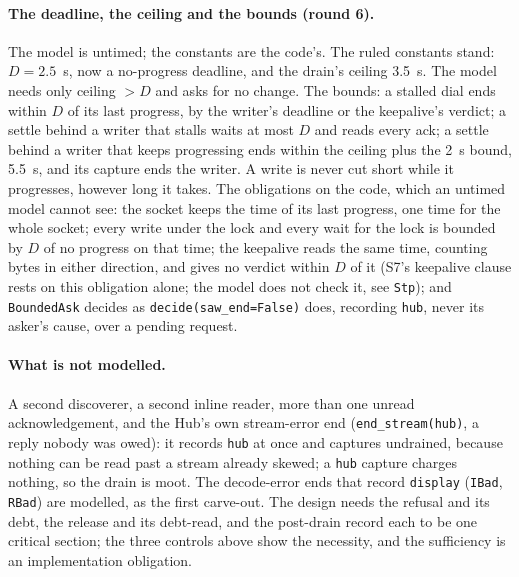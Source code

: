 \documentclass[a4paper,10pt,fleqn]{article}
\begin{document}
\paragraph{The deadline, the ceiling and the bounds (round 6).}  The model is
untimed; the constants are the code's.  The ruled constants stand: $D = 2.5$~s,
now a no-progress deadline, and the drain's ceiling 3.5~s.  The model needs only
ceiling $> D$ and asks for no change.  The bounds: a stalled dial ends within $D$
of its last progress, by the writer's deadline or the keepalive's verdict; a
settle behind a writer that stalls waits at most $D$ and reads every ack; a
settle behind a writer that keeps progressing ends within the ceiling plus the
2~s bound, 5.5~s, and its capture ends the writer.  A write is never cut short
while it progresses, however long it takes.  The obligations on the code, which
an untimed model cannot see: the socket keeps the time of its last progress, one
time for the whole socket; every write under the lock and every wait for the
lock is bounded by $D$ of no progress on that time; the keepalive reads the same
time, counting bytes in either direction, and gives no verdict within $D$ of it
(S7's keepalive clause rests on this obligation alone; the model does not check
it, see \texttt{Stp}); and \texttt{BoundedAsk} decides as
\texttt{decide(saw\_end=False)} does, recording \texttt{hub}, never its asker's
cause, over a pending request.

\paragraph{What is not modelled.}
A second discoverer, a second inline reader, more than one unread acknowledgement,
and the Hub's own stream-error end (\texttt{end\_stream(hub)}, a reply nobody was
owed): it records \texttt{hub} at once and captures undrained, because nothing can
be read past a stream already skewed; a \texttt{hub} capture charges nothing, so
the drain is moot.  The decode-error ends that record \texttt{display}
(\texttt{IBad}, \texttt{RBad}) are modelled, as the first carve-out.  The design
needs the refusal and its debt, the release and its debt-read, and the post-drain
record each to be one critical section; the three controls above show the
necessity, and the sufficiency is an implementation obligation.
\end{document}
